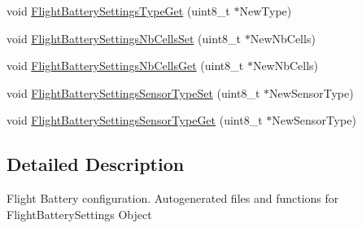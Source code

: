 \begin{DoxyCompactItemize}
void \hyperlink{group___flight_battery_settings_ga9a12142ddcadc7def217dd821d0d2814}{\-Flight\-Battery\-Settings\-Type\-Get} (uint8\-\_\-t $\ast$\-New\-Type)
\item 
void \hyperlink{group___flight_battery_settings_ga77b596c452cd6ad6ed2ee28a3b33d700}{\-Flight\-Battery\-Settings\-Nb\-Cells\-Set} (uint8\-\_\-t $\ast$\-New\-Nb\-Cells)
\item 
void \hyperlink{group___flight_battery_settings_ga358ec1527e27d0ea45a50faf7da03656}{\-Flight\-Battery\-Settings\-Nb\-Cells\-Get} (uint8\-\_\-t $\ast$\-New\-Nb\-Cells)
\item 
void \hyperlink{group___flight_battery_settings_ga601b32886ba956577935fcaf250a2036}{\-Flight\-Battery\-Settings\-Sensor\-Type\-Set} (uint8\-\_\-t $\ast$\-New\-Sensor\-Type)
\item 
void \hyperlink{group___flight_battery_settings_ga160570d1176d5f05307ac63c1ab1089c}{\-Flight\-Battery\-Settings\-Sensor\-Type\-Get} (uint8\-\_\-t $\ast$\-New\-Sensor\-Type)
\end{DoxyCompactItemize}


\subsection{\-Detailed \-Description}
\-Flight \-Battery configuration. \-Autogenerated files and functions for \-Flight\-Battery\-Settings \-Object 


